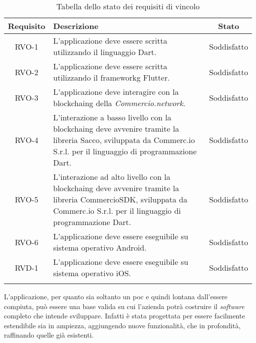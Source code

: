 \begin{longtable}{|c|p{8.35cm}|c|}
	\hline
	\rowcolor{gray}
	\textbf{Requisito} & \textbf{Descrizione} & \textbf{Stato} \\
	\hline
	RVO-1    & L'applicazione deve essere scritta utilizzando il linguaggio Dart. & Soddisfatto \\
	\hline
	RVO-2    & L'applicazione deve essere scritta utilizzando il \gls{frameworkg} Flutter. & Soddisfatto \\
	\hline
	RVO-3    & L'applicazione deve interagire con la \gls{blockchaing} della \textit{Commercio.network}. & Soddisfatto \\
	\hline
	RVO-4    & L'interazione a basso livello con la \gls{blockchaing} deve avvenire tramite la libreria Sacco, sviluppata da Commerc.io S.r.l. per il linguaggio di programmazione Dart. & Soddisfatto \\
	\hline
	RVO-5    & L'interazione ad alto livello con la \gls{blockchaing} deve avvenire tramite la libreria CommercioSDK, sviluppata da Commerc.io S.r.l. per il linguaggio di programmazione Dart. & Soddisfatto \\
	\hline
	RVO-6    & L'applicazione deve essere eseguibile su sistema operativo Android. & Soddisfatto \\
	\hline
	RVD-1    & L'applicazione deve essere eseguibile su sistema operativo iOS. & Soddisfatto \\
	\hline
	
	\caption{Tabella dello stato dei requisiti di vincolo}
	\label{tab:stato-requisiti-vincolo}
\end{longtable}

L'applicazione, per quanto sia soltanto un \gls{poc} e quindi lontana dall'essere compiuta, può essere una base valida su cui l'azienda potrà costruire il \textit{software} completo che intende sviluppare. Infatti è stata progettata per essere facilmente estendibile sia in ampiezza, aggiungendo nuove funzionalità, che in profondità, raffinando quelle già esistenti. 